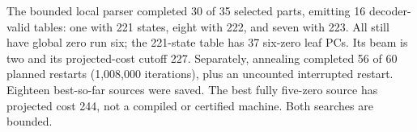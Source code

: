 The bounded local parser completed 30 of 35 selected parts, emitting
16 decoder-valid tables: one with 221 states, eight with 222, and seven
with 223. All still have global zero run six; the 221-state table has
37 six-zero leaf PCs. Its beam is two and its projected-cost cutoff 227.
Separately, annealing completed 56 of 60 planned restarts (1,008,000
iterations), plus an uncounted interrupted restart. Eighteen best-so-far
sources were saved. The best fully five-zero source has projected cost
244, not a compiled or certified machine. Both searches are bounded.
